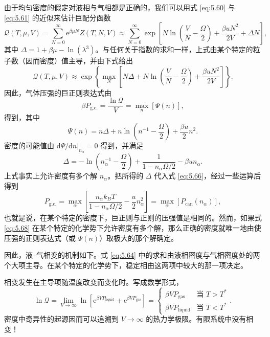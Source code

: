 
由于均匀密度的假定对液相与气相都是正确的，我们可以用式 \eqref{eq:5.60} 与 \eqref{eq:5.61} 的近似来估计巨配分函数
\begin{equation}\label{eq:5.64}
\mathcal{Q}(T,\mu,V)=\sum_{N=0}^\infty\mathrm{e}^{\beta\mu N}Z(T,N,V)\approx\sum_{N=0}^\infty\exp\left[N\ln\left(\frac{V}{N}-\frac{\Omega}{2}\right)+\frac{\beta uN^2}{2V}+\Delta N\right],
\end{equation}
其中 $\Delta=1+\beta\mu-\ln(\lambda^3)$。与任何关于指数的求和一样，上式由某个特定的粒子数（因而密度）值主导，并由下式给出
\begin{equation}\label{eq:5.65}
\mathcal{Q}(T,\mu,V)\approx\exp\left\{\max_N\left[N\Delta+N\ln\left(\frac{V}{N}-\frac{\Omega}{2}\right)+\frac{\beta uN^2}{2V}\right]\right\}.
\end{equation}
因此，气体压强的巨正则表达式由
\begin{equation}\label{eq:5.66}
\beta P_{\text{g.c.}}=\frac{\ln\mathcal{Q}}{V}=\max_n[\Psi(n)],
\end{equation}
得到，其中
\begin{equation}\label{eq:5.67}
\Psi(n)=n\Delta+n\ln\left(n^{-1}-\frac{\Omega}{2}\right)+\frac{\beta u}{2}n^2.
\end{equation}
密度的可能值由 $\mathrm{d}\Psi/\mathrm{d}n|_{n_\alpha}=0$ 得到，并满足
\begin{equation}\label{eq:5.68}
\Delta=-\ln\left(n_\alpha^{-1}-\frac{\Omega}{2}\right)+\frac{1}{1-n_\alpha\Omega/2}-\beta un_\alpha.
\end{equation}
上式事实上允许密度有多个解 $n_\alpha$。把所得的 $\Delta$ 代入式 \eqref{eq:5.66}，经过一些运算后得到
\begin{equation}\label{eq:5.69}
P_{\text{g.c.}}=\max_\alpha\left[\frac{n_\alpha k_BT}{1-n_\alpha\Omega/2}-\frac{u}{2}n_\alpha^2\right]=\max_\alpha[P_{\text{can}}(n_\alpha)],
\end{equation}
也就是说，在某个特定的密度下，巨正则与正则的压强值是相同的。然而，如果式 \eqref{eq:5.68} 在某个特定的化学势下允许密度有多个解，那么正确的密度就唯一地由使压强的正则表达式（或 $\Psi(n)$）取极大的那个解确定。

因此，液--气相变的机制如下。式 \eqref{eq:5.64} 中的求和由液相密度与气相密度处的两个大项主导。在某个特定的化学势下，稳定相由这两项中较大的那一项决定。



相变发生在主导项随温度改变而变化时。写成数学形式，
\begin{equation}\label{eq:5.70}
\ln\mathcal{Q}=\lim_{V\to\infty}\ln\left[\mathrm{e}^{\beta VP_{\text{liquid}}}+\mathrm{e}^{\beta VP_{\text{gas}}}\right]=\begin{cases}\beta VP_{\text{gas}} & \text{当 }T>T^*\\ \beta VP_{\text{liquid}} & \text{当 }T<T^*\end{cases}.
\end{equation}
密度中奇异性的起源因而可以追溯到 $V\to\infty$ 的热力学极限。有限系统中没有相变！

